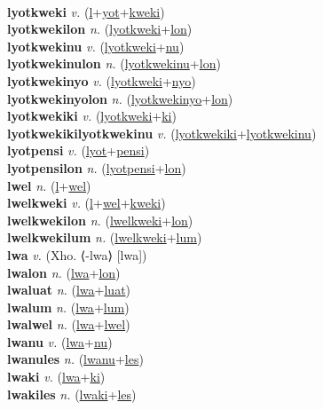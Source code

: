  \label{lyot} \\
\textbf{lyotkweki} \textit{v.} (\hyperref[l]{l}+\hyperref[yot]{yot}+\hyperref[kweki]{kweki})
 \label{lyotkweki} \\
\textbf{lyotkwekilon} \textit{n.} (\hyperref[lyotkweki]{lyotkweki}+\hyperref[lon]{lon})
 \label{lyotkwekilon} \\
\textbf{lyotkwekinu} \textit{v.} (\hyperref[lyotkweki]{lyotkweki}+\hyperref[nu]{nu})
 \label{lyotkwekinu} \\
\textbf{lyotkwekinulon} \textit{n.} (\hyperref[lyotkwekinu]{lyotkwekinu}+\hyperref[lon]{lon})
 \label{lyotkwekinulon} \\
\textbf{lyotkwekinyo} \textit{v.} (\hyperref[lyotkweki]{lyotkweki}+\hyperref[nyo]{nyo})
 \label{lyotkwekinyo} \\
\textbf{lyotkwekinyolon} \textit{n.} (\hyperref[lyotkwekinyo]{lyotkwekinyo}+\hyperref[lon]{lon})
 \label{lyotkwekinyolon} \\
\textbf{lyotkwekiki} \textit{v.} (\hyperref[lyotkweki]{lyotkweki}+\hyperref[ki]{ki})
 \label{lyotkwekiki} \\
\textbf{lyotkwekikilyotkwekinu} \textit{v.} (\hyperref[lyotkwekiki]{lyotkwekiki}+\hyperref[lyotkwekinu]{lyotkwekinu})
 \label{lyotkwekikilyotkwekinu} \\
\textbf{lyotpensi} \textit{v.} (\hyperref[lyot]{lyot}+\hyperref[pensi]{pensi})
 \label{lyotpensi} \\
\textbf{lyotpensilon} \textit{n.} (\hyperref[lyotpensi]{lyotpensi}+\hyperref[lon]{lon})
 \label{lyotpensilon} \\
\textbf{lwel} \textit{n.} (\hyperref[l]{l}+\hyperref[wel]{wel})
 \label{lwel} \\
\textbf{lwelkweki} \textit{v.} (\hyperref[l]{l}+\hyperref[wel]{wel}+\hyperref[kweki]{kweki})
 \label{lwelkweki} \\
\textbf{lwelkwekilon} \textit{n.} (\hyperref[lwelkweki]{lwelkweki}+\hyperref[lon]{lon})
 \label{lwelkwekilon} \\
\textbf{lwelkwekilum} \textit{n.} (\hyperref[lwelkweki]{lwelkweki}+\hyperref[lum]{lum})
 \label{lwelkwekilum} \\
\textbf{lwa} \textit{v.} (Xho. ⟨-lwa⟩ [lwa])
 \label{lwa} \\
\textbf{lwalon} \textit{n.} (\hyperref[lwa]{lwa}+\hyperref[lon]{lon})
 \label{lwalon} \\
\textbf{lwaluat} \textit{n.} (\hyperref[lwa]{lwa}+\hyperref[luat]{luat})
 \label{lwaluat} \\
\textbf{lwalum} \textit{n.} (\hyperref[lwa]{lwa}+\hyperref[lum]{lum})
 \label{lwalum} \\
\textbf{lwalwel} \textit{n.} (\hyperref[lwa]{lwa}+\hyperref[lwel]{lwel})
 \label{lwalwel} \\
\textbf{lwanu} \textit{v.} (\hyperref[lwa]{lwa}+\hyperref[nu]{nu})
 \label{lwanu} \\
\textbf{lwanules} \textit{n.} (\hyperref[lwanu]{lwanu}+\hyperref[les]{les})
 \label{lwanules} \\
\textbf{lwaki} \textit{v.} (\hyperref[lwa]{lwa}+\hyperref[ki]{ki})
 \label{lwaki} \\
\textbf{lwakiles} \textit{n.} (\hyperref[lwaki]{lwaki}+\hyperref[les]{les})
 \label{lwakiles} \\
